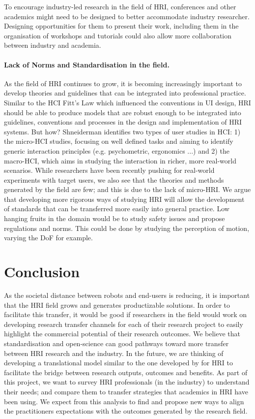\documentclass[letterpaper]{article} %
\begin{document}
To encourage industry-led research in the field of HRI, conferences and other academics might need to be designed to better accommodate industry researcher. Designing opportunities for them to present their work, including them in the organisation of workshops and tutorials could also allow more collaboration between industry and academia. 

\paragraph{Lack of Norms and Standardisation in the field.}
As the field of HRI continues to grow, it is becoming increasingly important to develop theories and guidelines that can be integrated into professional practice. Similar to the HCI Fitt's Law which influenced the conventions in UI design, HRI should be able to produce models that are robust enough to be integrated into guidelines, conventions and processes in the design and implementation of HRI systems. But how? 
Shneiderman \cite{shneiderman_growth_2017} identifies two types of user studies in HCI: 1) the micro-HCI studies, focusing on well defined tasks and aiming to identify generic interaction principles (e.g. psychometric, ergonomics ...) and 2) the macro-HCI, which aims in studying the interaction in richer, more real-world scenarios. 
While researchers have been recently pushing for real-world experiments with target users, we also see that the theories and methods generated by the field are few; and this is due to the lack of micro-HRI. 
We argue that developing more rigorous ways of studying HRI will allow the development of standards that can be transferred more easily into general practice. Low hanging fruits in the domain would be to study safety issues and propose regulations and norms. This could be done by studying the perception of motion, varying the DoF for example. 


\section{Conclusion}
As the societal distance between robots and end-users is reducing, it is important that the HRI field grows and generates productizable solutions. 
In order to facilitate this transfer, it would be good if researchers in the field would work on developing research transfer channels for each of their research project to easily highlight the commercial potential of their research outcomes. We believe that standardisation and open-science can good pathways toward more transfer between HRI research and the industry. 
In the future, we are thinking of developing a translational model similar to the one developed by \cite{10.1145/3290605.3300231} for HRI to facilitate the bridge between research outputs, outcomes and benefits.
As part of this project, we want to survey HRI professionals (in the industry) to understand their needs; and compare them to transfer strategies that academics in HRI have been using. We expect from this analysis to find and propose new ways to align the practitioners expectations with the outcomes generated by the research field. 
\end{document}
